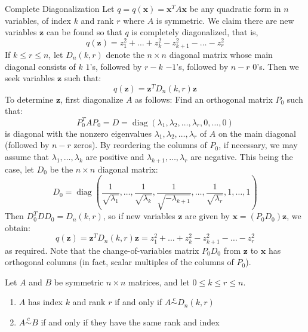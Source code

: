 \documentclass[12pt]{article}
\begin{document}
\begin{note}{Complete Diagonalization}{}
    Let $ q = q \left( \mathbf{x} \right) = \mathbf{x}^T A \mathbf{x} $ be any quadratic form in $ n $ variables, of index $ k $ and rank $ r $ where $ A $ is symmetric. We claim there are new variables $ \mathbf{z} $ can be found so that $ q $ is completely diagonalized, that is,
    \[ q \left( \mathbf{z} \right) = z_1^2 + \dots + z_k^2 - z_{k+1}^2 - \dots - z_r^2 \]
    If $ k \leq r \leq n $, let $ D_n \left( k, r \right) $ denote the $ n \times n $ diagonal matrix whose main diagonal consists of $ k $ $ 1 $'s, followed by $ r - k $ $ -1 $'s, followed by $ n - r $ $ 0 $'s. Then we seek variables $ \mathbf{z} $ such that:
    \[ q \left( \mathbf{z} \right) = \mathbf{z}^T D_n \left( k, r \right) \mathbf{z} \]
    To determine $ \mathbf{z} $, first diagonalize $ A $ as follows: Find an orthogonal matrix $ P_0 $ such that:
    \[ P_0^T A P_0 = D = \operatorname{diag} \left( \lambda_1, \lambda_2, \dots, \lambda_r, 0, \dots, 0 \right) \]
    is diagonal with the nonzero eigenvalues $ \lambda_1, \lambda_2, \dots, \lambda_r $ of $ A $ on the main diagonal (followed by $ n - r $ zeros). By reordering the columns of $ P_0 $, if necessary, we may assume that $ \lambda_1, \dots, \lambda_k $ are positive and $ \lambda_{k + 1}, \dots, \lambda_r $ are negative. This being the case, let $ D_0 $ be the $ n \times n $ diagonal matrix:
    \[ D_0 = \operatorname{diag} \left( \frac{1}{\sqrt{\lambda_1}}, \dots, \frac{1}{\sqrt{\lambda_k}}, \frac{1}{\sqrt{-\lambda_{k+1}}}, \dots, \frac{1}{\sqrt{\lambda_r}}, 1, \dots, 1 \right) \]
    Then $ D_0^T D D_0 = D_n \left( k, r \right) $, so if new variables $ \mathbf{z} $ are given by $ \mathbf{x} = \left( P_0 D_0 \right) \mathbf{z} $, we obtain:
    \[ q \left( \mathbf{z} \right) = \mathbf{z}^T D_n \left( k, r \right) \mathbf{z} = z_1^2 + \dots + z_k^2 - z_{k+1}^2 - \dots - z_r^2 \]
    as required. Note that the change-of-variables matrix $ P_0 D_0 $ from $ \mathbf{z} $ to $ \mathbf{x} $ has orthogonal columns (in fact, scalar multiples of the columns of $ P_0 $).
\end{note}

\begin{theorem}{}{}
    Let $ A $ and $ B $ be symmetric $ n \times n $ matrices, and let $ 0 \leq k \leq r \leq n $.
    \begin{enumerate}[label=(\roman*)]
        \item $ A $ has index $ k $ and rank $ r $ if and only if $ A \overset{c}{\sim} D_n \left( k, r \right) $
        \item $ A \overset{c}{\sim} B $ if and only if they have the same rank and index
    \end{enumerate}
\end{theorem}
\end{document}
